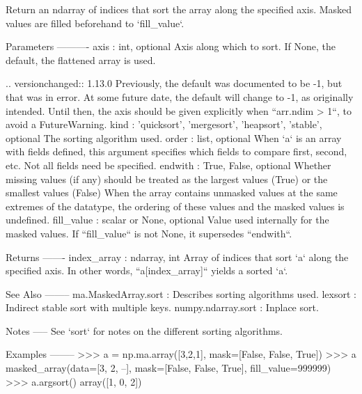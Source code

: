\begin{DoxyVerb}Return an ndarray of indices that sort the array along the
specified axis.  Masked values are filled beforehand to
`fill_value`.

Parameters
----------
axis : int, optional
    Axis along which to sort. If None, the default, the flattened array
    is used.

    ..  versionchanged:: 1.13.0
Previously, the default was documented to be -1, but that was
in error. At some future date, the default will change to -1, as
originally intended.
Until then, the axis should be given explicitly when
``arr.ndim > 1``, to avoid a FutureWarning.
kind : {'quicksort', 'mergesort', 'heapsort', 'stable'}, optional
    The sorting algorithm used.
order : list, optional
    When `a` is an array with fields defined, this argument specifies
    which fields to compare first, second, etc.  Not all fields need be
    specified.
endwith : {True, False}, optional
    Whether missing values (if any) should be treated as the largest values
    (True) or the smallest values (False)
    When the array contains unmasked values at the same extremes of the
    datatype, the ordering of these values and the masked values is
    undefined.
fill_value : scalar or None, optional
    Value used internally for the masked values.
    If ``fill_value`` is not None, it supersedes ``endwith``.

Returns
-------
index_array : ndarray, int
    Array of indices that sort `a` along the specified axis.
    In other words, ``a[index_array]`` yields a sorted `a`.

See Also
--------
ma.MaskedArray.sort : Describes sorting algorithms used.
lexsort : Indirect stable sort with multiple keys.
numpy.ndarray.sort : Inplace sort.

Notes
-----
See `sort` for notes on the different sorting algorithms.

Examples
--------
>>> a = np.ma.array([3,2,1], mask=[False, False, True])
>>> a
masked_array(data=[3, 2, --],
     mask=[False, False,  True],
       fill_value=999999)
>>> a.argsort()
array([1, 0, 2])\end{DoxyVerb}
 \mbox{\label{classnumpy_1_1ma_1_1core_1_1MaskedArray_a6acc5bfbe70aa578db2cdaeaccea1c27}} 
